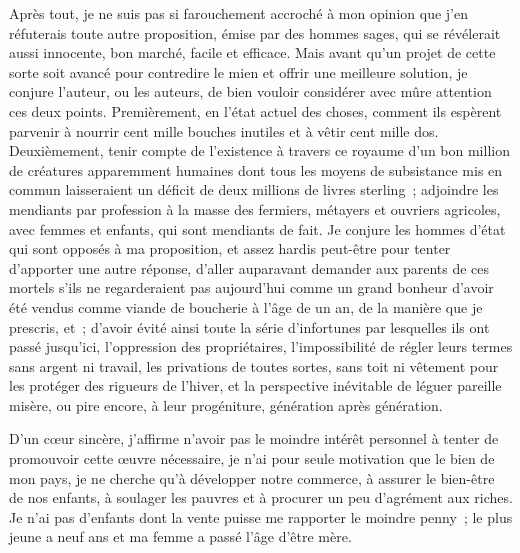 \documentclass[french,twoside]{book} %
\newif\ifdev
\renewcommand{\LettrineFontHook}{\color{rubric}}
\newcommand{\initialiv}[2]{%
  \let\oldLFH\LettrineFontHook
  \IfSubStr{QJ’}{#1}{
    \lettrine[lines=4, lhang=0.2, loversize=-0.1, lraise=0.2]{\smash{#1}}{#2}
  }{\IfSubStr{É}{#1}{
    \lettrine[lines=4, lhang=0.2, loversize=-0, lraise=0]{\smash{#1}}{#2}
  }{\IfSubStr{ÀÂ}{#1}{
    \lettrine[lines=4, lhang=0.2, loversize=-0, lraise=0, slope=0.6em]{\smash{#1}}{#2}
  }{\IfSubStr{A}{#1}{
    \lettrine[lines=4, lhang=0.2, loversize=0.2, slope=0.6em]{\smash{#1}}{#2}
  }{\IfSubStr{V}{#1}{
    \lettrine[lines=4, lhang=0.2, loversize=0.2, slope=-0.5em]{\smash{#1}}{#2}
  }{
    \lettrine[lines=4, lhang=0.2, loversize=0.2]{\smash{#1}}{#2}
  }}}}}
  \let\LettrineFontHook\oldLFH
}
\renewcommand{\LettrineFontHook}{\bfseries\color{rubric}}
\begin{document}
Après tout, je ne suis pas si farouchement accroché à mon opinion que j’en réfuterais toute autre proposition, émise par des hommes sages, qui se révélerait aussi innocente, bon marché, facile et efficace. Mais avant qu’un projet de cette sorte soit avancé pour contredire le mien et offrir une meilleure solution, je conjure l’auteur, ou les auteurs, de bien vouloir considérer avec mûre attention ces deux points. Premièrement, en l’état actuel des choses, comment ils espèrent parvenir à nourrir cent mille bouches inutiles et à vêtir cent mille dos. Deuxièmement, tenir compte de l’existence à travers ce royaume d’un bon million de créatures apparemment humaines dont tous les moyens de subsistance mis en commun laisseraient un déficit de deux millions de livres sterling ; adjoindre les mendiants par profession à la masse des fermiers, métayers et ouvriers agricoles, avec femmes et enfants, qui sont mendiants de fait. Je conjure les hommes d’état qui sont opposés à ma proposition, et assez hardis peut-être pour tenter d’apporter une autre réponse, d’aller auparavant demander aux parents de ces mortels s’ils ne regarderaient pas aujourd’hui comme un grand bonheur d’avoir été vendus comme viande de boucherie à l’âge de un an, de la manière que je prescris, et ; d’avoir évité ainsi toute la série d’infortunes par lesquelles ils ont passé jusqu’ici, l’oppression des propriétaires, l’impossibilité de régler leurs termes sans argent ni travail, les privations de toutes sortes, sans toit ni vêtement pour les protéger des rigueurs de l’hiver, et la perspective inévitable de léguer pareille misère, ou pire encore, à leur progéniture, génération après génération.\par
D’un cœur sincère, j’affirme n’avoir pas le moindre intérêt personnel à tenter de promouvoir cette œuvre nécessaire, je n’ai pour seule motivation que le bien de mon pays, je ne cherche qu’à développer notre commerce, à assurer le bien-être de nos enfants, à soulager les pauvres et à procurer un peu d’agrément aux riches. Je n’ai pas d’enfants dont la vente puisse me rapporter le moindre penny ; le plus jeune a neuf ans et ma femme a passé l’âge d’être mère.
 


\ifbooklet
  \newpage\null\thispagestyle{empty}\newpage
\fi

\ifdev %
\fontname\font — \textsc{Les règles du jeu}\par
(\hyperref[utopie]{\underline{Lien}})\par
\noindent \initialiv{A}{lors là}\blindtext\par
\noindent \initialiv{À}{ la bonheur des dames}\blindtext\par
\noindent \initialiv{É}{tonnez-le}\blindtext\par
\noindent \initialiv{Q}{ualitativement}\blindtext\par
\noindent \initialiv{V}{aloriser}\blindtext\par
\Blindtext
\phantomsection
\label{utopie}
\Blinddocument
\fi
\end{document}
